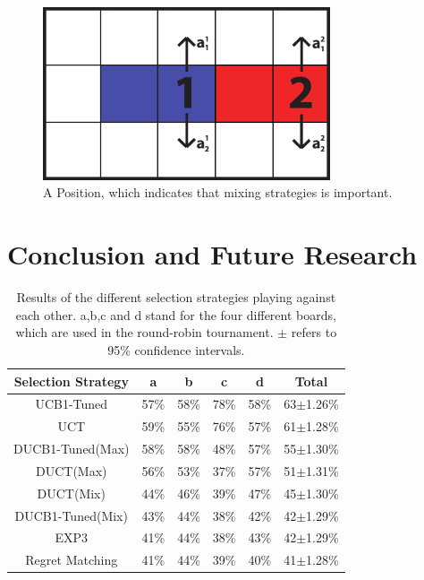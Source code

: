 \documentclass{article}
\begin{document}
\begin{figure}
\begin{center}
\includegraphics[width=8.5cm]{images/stochastic.pdf}
\caption{A Position, which indicates that mixing strategies is important.}
\label{fig:stochastic}
\end{center}
\end{figure}

\section{Conclusion and Future Research}
\label{sec:conclusion}

\begin{table}[h]\scriptsize
\caption{Results of the different selection strategies playing against each other. a,b,c and d stand for the four different boards, which are used in the round-robin tournament. $\pm$ refers to 95\% confidence intervals.}
\centering
\begin{tabular}{|c||c|c|c|c|c|}
									\hline
	Selection Strategy	& a 		  & b 		  & c 		  & d 		  & Total 	\\ \hline
	UCB1-Tuned		      & 57\%	  & 58\%		& 78\%		& 58\%		& 63$\pm$1.26\%		\\ \hline
	UCT			            & 59\%		& 55\%		& 76\%		& 57\%		& 61$\pm$1.28\%		\\ \hline
	DUCB1-Tuned(Max)	  & 58\%		& 58\%		& 48\%		& 57\%		& 55$\pm$1.30\%		\\ \hline
	DUCT(Max)		        & 56\%		& 53\%		& 37\%		& 57\%		& 51$\pm$1.31\%		\\ \hline
	DUCT(Mix)		        & 44\%		& 46\%		& 39\%		& 47\%		& 45$\pm$1.30\%		\\ \hline
	DUCB1-Tuned(Mix)	  & 43\%		& 44\%		& 38\%		& 42\%		& 42$\pm$1.29\%		\\ \hline
	EXP3			          & 41\%		& 44\%		& 38\%		& 43\%		& 42$\pm$1.29\%		\\ \hline
	Regret Matching		  & 41\%		& 44\%		& 39\%		& 40\%		& 41$\pm$1.28\%		\\ \hline
\end{tabular}
\label{table:round_robin_results}
\end{table}
\end{document}
